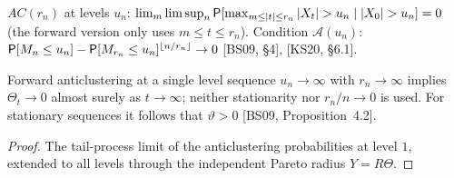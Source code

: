 \begin{definition}
  \label{def:anticlustering}
  \leanok
  $AC(r_n)$ at levels $u_n$: $\lim_m \limsup_n \mathsf{P}[\max_{m \le |t| \le r_n} |X_t| > u_n \mid |X_0| > u_n] = 0$
  (the forward version only uses $m \le t \le r_n$). Condition $\mathcal A(u_n)$:
  $\mathsf{P}[M_n \le u_n] - \mathsf{P}[M_{r_n} \le u_n]^{\lfloor n/r_n \rfloor} \to 0$ [BS09, \S4], [KS20, \S6.1].
\end{definition}

\begin{theorem}
  \label{thm:ac-theta-zero}
  \leanok
  Forward anticlustering at a single level sequence $u_n \to \infty$ with $r_n \to \infty$ implies
  $\Theta_t \to 0$ almost surely as $t \to \infty$; neither stationarity nor $r_n/n \to 0$ is used.
  For stationary sequences it follows that $\vartheta > 0$ [BS09, Proposition~4.2].
\end{theorem}
\begin{proof}
  \leanok
  The tail-process limit of the anticlustering probabilities at level $1$, extended to all levels
  through the independent Pareto radius $Y = R\Theta$.
\end{proof}

